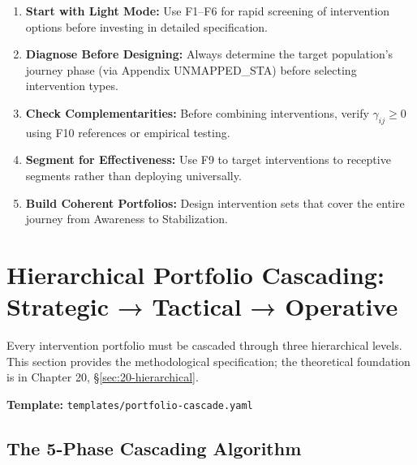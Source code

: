 \begin{tcolorbox}[colback=green!5!white, colframe=green!75!black,
    title=Practical Implications]
\begin{enumerate}
\item \textbf{Start with Light Mode:} Use F1--F6 for rapid screening of intervention options before investing in detailed specification.

\item \textbf{Diagnose Before Designing:} Always determine the target population's journey phase (via Appendix UNMAPPED_STA) before selecting intervention types.

\item \textbf{Check Complementarities:} Before combining interventions, verify $\gamma_{ij} \geq 0$ using F10 references or empirical testing.

\item \textbf{Segment for Effectiveness:} Use F9 to target interventions to receptive segments rather than deploying universally.

\item \textbf{Build Coherent Portfolios:} Design intervention sets that cover the entire journey from Awareness to Stabilization.
\end{enumerate}
\end{tcolorbox}


\section{Hierarchical Portfolio Cascading: Strategic → Tactical → Operative}
\label{sec:hhh-cascade}

\begin{tcolorbox}[colback=purple!5!white, colframe=purple!75!black,
    title=\textbf{Canonical Method: Portfolio Cascading (Ch.\,20 Integration)}]
Every intervention portfolio must be cascaded through three hierarchical levels.
This section provides the methodological specification; the theoretical foundation
is in Chapter 20, \S\ref{sec:20-hierarchical}.

\textbf{Template:} \texttt{templates/portfolio-cascade.yaml}
\end{tcolorbox}

\subsection{The 5-Phase Cascading Algorithm}
\label{sec:hhh-cascade-algorithm}

